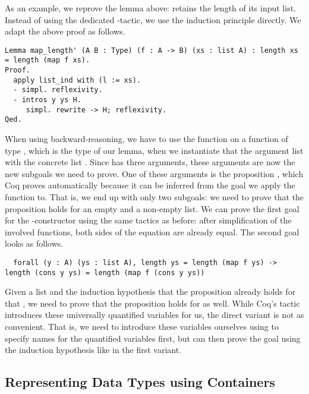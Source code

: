 As an example, we reprove the lemma above:  retains the length of its input list.
Instead of using the dedicated -tactic, we use the induction principle directly.
We adapt the above proof as follows.

\begin{verbatim}
Lemma map_length' (A B : Type) (f : A -> B) (xs : list A) : length xs = length (map f xs).
Proof.
  apply list_ind with (l := xs).
  - simpl. reflexivity.
  - intros y ys H.
     simpl. rewrite -> H; reflexivity.
Qed.
\end{verbatim}

When using backward-reasoning, we have to use the function  on a function of type , which is the type of our lemma, when we instantiate that the argument list  with the concrete list .
Since  has three arguments, these arguments are now the new subgoals we need to prove.
One of these arguments is the proposition , which Coq proves automatically because it can be inferred from the goal we apply the function to.
That is, we end up with only two subgoals: we need to prove that the proposition holds for an empty and a non-empty list.
We can prove the first goal for the -constructor using the same tactics as before: after simplification of the involved functions, both sides of the equation are already equal.
The second goal looks as follows.

\begin{verbatim}
  forall (y : A) (ys : list A), length ys = length (map f ys) -> length (cons y ys) = length (map f (cons y ys))
\end{verbatim}

Given a list  and the induction hypothesis that the proposition already holds for that , we need to prove that the proposition holds for  as well.
While Coq's  tactic introduces these universally quantified variables for us, the direct variant is not as convenient.
That is, we need to introduce these variables ourselves using  to specify names for the quantified variables first, but can then prove the goal using the induction hypothesis like in the first variant.

\subsection{Representing Data Types using Containers}

